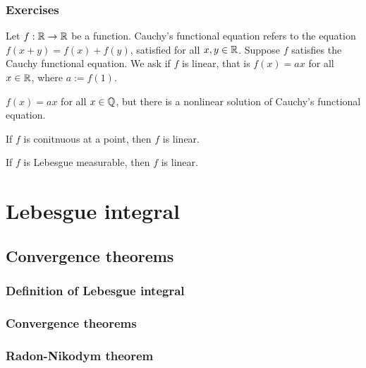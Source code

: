 \documentclass{../note}
\begin{document}
\section*{Exercises}
\begin{prb}
Let $f:\mathbb{R}\to\mathbb{R}$ be a function.
Cauchy's functional equation refers to the equation $f(x+y)=f(x)+f(y)$, satisfied for all $x,y\in\mathbb{R}$.
Suppose $f$ satisfies the Cauchy functional equation.
We ask if $f$ is linear, that is $f(x)=ax$ for all $x\in\mathbb{R}$, where $a:=f(1)$.
\begin{parts}
\item $f(x)=ax$ for all $x\in\mathbb{Q}$, but there is a nonlinear solution of Cauchy's functional equation.
\item If $f$ is conitnuous at a point, then $f$ is linear.
\item If $f$ is Lebesgue measurable, then $f$ is linear.
\end{parts}
\end{prb}









\part{Lebesgue integral}


\chapter{Convergence theorems}
\section{Definition of Lebesgue integral}
\section{Convergence theorems}

\begin{prb}
\end{prb}




\section{Radon-Nikodym theorem}
\end{document}
